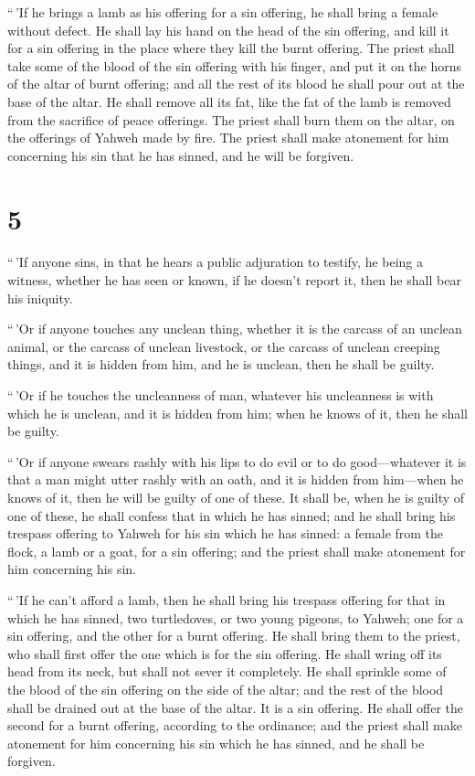  ``\,'If he brings a lamb as his offering for a sin
offering, he shall bring a female without defect.  He
shall lay his hand on the head of the sin offering, and kill it for a
sin offering in the place where they kill the burnt offering.
 The priest shall take some of the blood of the sin
offering with his finger, and put it on the horns of the altar of burnt
offering; and all the rest of its blood he shall pour out at the base of
the altar.  He shall remove all its fat, like the fat of
the lamb is removed from the sacrifice of peace offerings. The priest
shall burn them on the altar, on the offerings of Yahweh made by fire.
The priest shall make atonement for him concerning his sin that he has
sinned, and he will be forgiven.

\hypertarget{section-4}{%
\section{5}\label{section-4}}

 ``\,'If anyone sins, in that he hears a public adjuration
to testify, he being a witness, whether he has seen or known, if he
doesn't report it, then he shall bear his iniquity.

 ``\,'Or if anyone touches any unclean thing, whether it
is the carcass of an unclean animal, or the carcass of unclean
livestock, or the carcass of unclean creeping things, and it is hidden
from him, and he is unclean, then he shall be guilty.

 ``\,'Or if he touches the uncleanness of man, whatever
his uncleanness is with which he is unclean, and it is hidden from him;
when he knows of it, then he shall be guilty.

 ``\,'Or if anyone swears rashly with his lips to do evil
or to do good---whatever it is that a man might utter rashly with an
oath, and it is hidden from him---when he knows of it, then he will be
guilty of one of these.  It shall be, when he is guilty of
one of these, he shall confess that in which he has sinned;
 and he shall bring his trespass offering to Yahweh for
his sin which he has sinned: a female from the flock, a lamb or a goat,
for a sin offering; and the priest shall make atonement for him
concerning his sin.

 ``\,'If he can't afford a lamb, then he shall bring his
trespass offering for that in which he has sinned, two turtledoves, or
two young pigeons, to Yahweh; one for a sin offering, and the other for
a burnt offering.  He shall bring them to the priest, who
shall first offer the one which is for the sin offering. He shall wring
off its head from its neck, but shall not sever it completely.
 He shall sprinkle some of the blood of the sin offering
on the side of the altar; and the rest of the blood shall be drained out
at the base of the altar. It is a sin offering.  He shall
offer the second for a burnt offering, according to the ordinance; and
the priest shall make atonement for him concerning his sin which he has
sinned, and he shall be forgiven.

